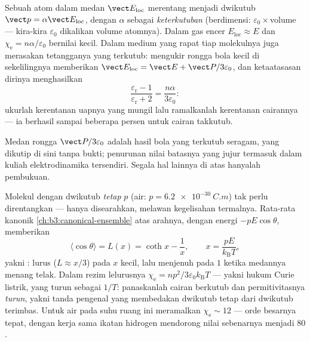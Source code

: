 \begin{proposition}\label{prop:b3:electromagnetism-in-matter:mossotti}
Sebuah atom dalam medan $\vect E_{\text{loc}}$ merentang menjadi dwikutub
$\vect p = \alpha\vect E_{\text{loc}}$, dengan $\alpha$ sebagai
\emph{keterkutuban} (berdimensi: $\varepsilon_0\times$volume ---
kira-kira $\varepsilon_0$ dikalikan volume atomnya). Dalam gas encer
$E_{\text{loc}} \approx E$ dan $\chi_{\text{e}} =
n\alpha/\varepsilon_0$ bernilai kecil. Dalam medium yang rapat tiap
molekulnya juga merasakan tetangganya yang terkutub: mengukir rongga bola
kecil di sekelilingnya memberikan $\vect E_{\text{loc}} = \vect E + \vect
P/3\varepsilon_0$, dan ketaatasasan dirinya menghasilkan
\emph{}
\[
\frac{\varepsilon_{\text{r}} - 1}{\varepsilon_{\text{r}} + 2}
= \frac{n\alpha}{3\varepsilon_0} :
\]
ukurlah kerentanan uapnya yang mungil lalu ramalkanlah kerentanan
cairannya --- ia berhasil sampai beberapa persen untuk cairan takkutub.
\end{proposition}
\admitted

\begin{remark}
Medan rongga $\vect P/3\varepsilon_0$ adalah hasil bola yang terkutub
seragam, yang dikutip di sini tanpa bukti; penurunan nilai batasnya yang
jujur termasuk dalam kuliah elektrodinamika tersendiri. Segala hal
lainnya di atas hanyalah pembukuan.
\end{remark}

\begin{proposition}\label{prop:b3:electromagnetism-in-matter:langevin}
Molekul dengan dwikutub \emph{tetap} $p$ (air:
$p = \qty{6.2e-30}{C.m}$) tak perlu direntangkan --- hanya disearahkan,
melawan kegelisahan termalnya. Rata-rata kanonik
\cref{ch:b3:canonical-ensemble} atas arahnya, dengan energi
$-pE\cos\theta$, memberikan
\[
\langle\cos\theta\rangle = L(x) = \coth x - \frac1x ,
\qquad x = \frac{pE}{k_{\text{B}}T} ,
\]
yakni \emph{}: lurus ($L \approx x/3$) pada $x$ kecil,
lalu menjenuh pada $1$ ketika medannya menang telak. Dalam rezim
lelurusnya $\chi_{\text{e}} = np^2/3\varepsilon_0k_{\text{B}}T$ --- yakni
hukum Curie listrik, yang turun sebagai $1/T$: panaskanlah cairan
berkutub dan permitivitasnya \emph{turun}, yakni tanda pengenal yang
membedakan dwikutub tetap dari dwikutub terimbas. Untuk air pada suhu
ruang ini meramalkan
$\chi_{\text{e}} \sim 12$ --- orde besarnya tepat, dengan kerja sama
ikatan hidrogen mendorong nilai sebenarnya menjadi $80$.
\end{proposition}

